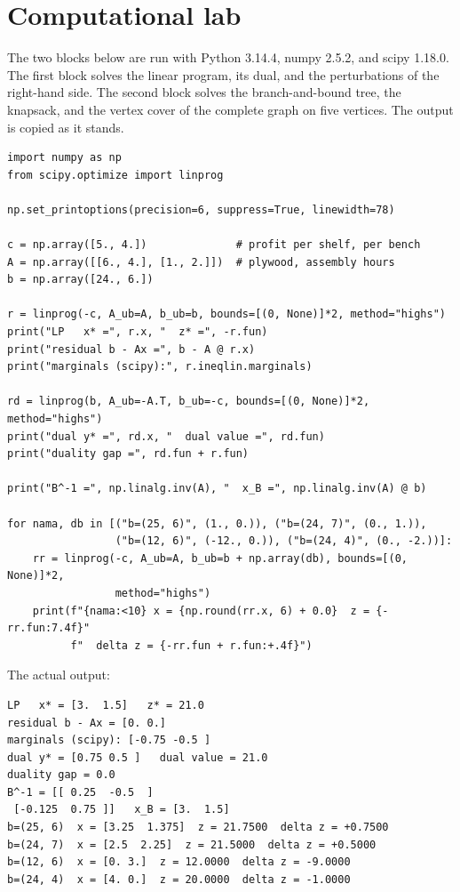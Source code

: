 
\section{Computational lab}

The two blocks below are run with Python 3.14.4, numpy 2.5.2, and scipy 1.18.0. The first block
solves the linear program, its dual, and the perturbations of the right-hand side. The second
block solves the branch-and-bound tree, the knapsack, and the vertex cover of the complete graph
on five vertices. The output is copied as it stands.

\begin{lab}
\begin{verbatim}
import numpy as np
from scipy.optimize import linprog

np.set_printoptions(precision=6, suppress=True, linewidth=78)

c = np.array([5., 4.])              # profit per shelf, per bench
A = np.array([[6., 4.], [1., 2.]])  # plywood, assembly hours
b = np.array([24., 6.])

r = linprog(-c, A_ub=A, b_ub=b, bounds=[(0, None)]*2, method="highs")
print("LP   x* =", r.x, "  z* =", -r.fun)
print("residual b - Ax =", b - A @ r.x)
print("marginals (scipy):", r.ineqlin.marginals)

rd = linprog(b, A_ub=-A.T, b_ub=-c, bounds=[(0, None)]*2, method="highs")
print("dual y* =", rd.x, "  dual value =", rd.fun)
print("duality gap =", rd.fun + r.fun)

print("B^-1 =", np.linalg.inv(A), "  x_B =", np.linalg.inv(A) @ b)

for nama, db in [("b=(25, 6)", (1., 0.)), ("b=(24, 7)", (0., 1.)),
                 ("b=(12, 6)", (-12., 0.)), ("b=(24, 4)", (0., -2.))]:
    rr = linprog(-c, A_ub=A, b_ub=b + np.array(db), bounds=[(0, None)]*2,
                 method="highs")
    print(f"{nama:<10} x = {np.round(rr.x, 6) + 0.0}  z = {-rr.fun:7.4f}"
          f"  delta z = {-rr.fun + r.fun:+.4f}")
\end{verbatim}
The actual output:
\begin{verbatim}
LP   x* = [3.  1.5]   z* = 21.0
residual b - Ax = [0. 0.]
marginals (scipy): [-0.75 -0.5 ]
dual y* = [0.75 0.5 ]   dual value = 21.0
duality gap = 0.0
B^-1 = [[ 0.25  -0.5  ]
 [-0.125  0.75 ]]   x_B = [3.  1.5]
b=(25, 6)  x = [3.25  1.375]  z = 21.7500  delta z = +0.7500
b=(24, 7)  x = [2.5  2.25]  z = 21.5000  delta z = +0.5000
b=(12, 6)  x = [0. 3.]  z = 12.0000  delta z = -9.0000
b=(24, 4)  x = [4. 0.]  z = 20.0000  delta z = -1.0000
\end{verbatim}
\end{lab}

